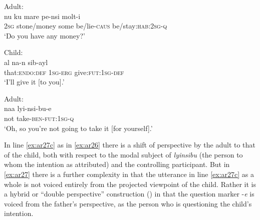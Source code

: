 \documentclass[output=paper]{langsci/langscibook}
\begin{document}
\begin{exe}
	\ex \label{ex:ar27}
	\begin{xlist}
	\ex Adult:\label{ex:ar27a}\\
	\gll nu ku mare pe-nsi molt-i\\
	2\textsc{sg} stone/money some be/lie-\textsc{caus} be/stay:\textsc{hab}:2\textsc{sg}-\textsc{q}\\
	\trans ‘Do you have any money?’	
	
	\ex Child:\label{ex:ar27b}\\
	\gll al na-n sib-ayl\\
	that:\textsc{endo}:\textsc{def}	1\textsc{sg}-\textsc{erg}			give:\textsc{fut}:1\textsc{sg}-\textsc{def}\\
	\trans ‘I’ll give it [to you].’
	
	\ex Adult:\label{ex:ar27c}\\
	\gll naa	 lyi-nsi-bu-e\\
	not take-\textsc{ben}-\textsc{fut}:1\textsc{sg}-\textsc{q}\\
	\trans ‘Oh, so you’re not going to take it [for yourself].’
	\end{xlist}
\end{exe}

In line \ref{ex:ar27c} as in \ref{ex:ar26} there is a shift of perspective by the adult to that of the child, both with respect to the modal subject of \textit{lyinsibu} (the person to whom the intention as attributed) and the controlling participant. But in \ref{ex:ar27} there is a further complexity in that the utterance in line \ref{ex:ar27c} as a whole is not voiced entirely from the projected viewpoint of the child. Rather it is a hybrid or “double perspective” construction (\citealt{Evans2006}) in that the question marker -\textit{e} is voiced from the father’s perspective, as the person who is questioning the child’s intention.
\end{document}

